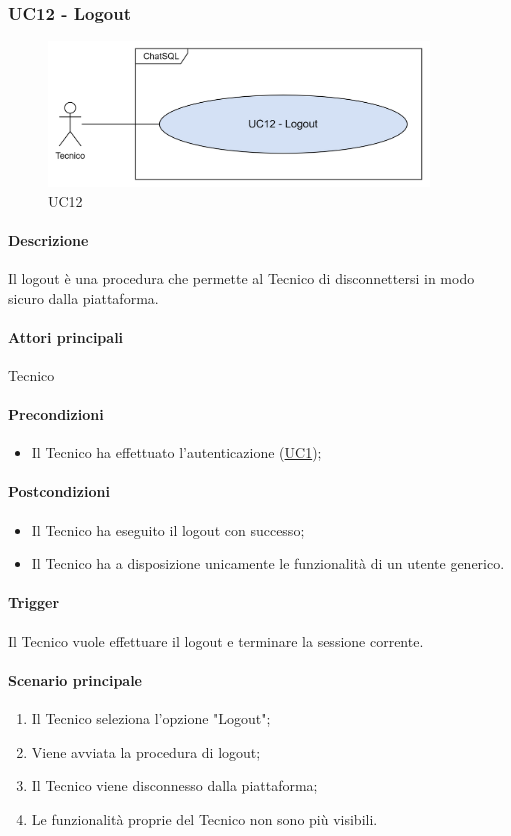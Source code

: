 \subsubsection{UC12 - Logout}\label{UC12}

\begin{figure}[H]
  \centering
  \includegraphics[width=0.90\textwidth]{assets/uc12.png}
  \caption{UC12}
\end{figure}

\paragraph*{Descrizione}
Il logout è una procedura che permette al Tecnico di disconnettersi in modo sicuro dalla piattaforma.

\paragraph*{Attori principali}
Tecnico

\paragraph*{Precondizioni}
\begin{itemize}
  \item Il Tecnico ha effettuato l'autenticazione (\hyperref[UC1]{UC1});
\end{itemize}

\paragraph*{Postcondizioni}
\begin{itemize}
  \item Il Tecnico ha eseguito il logout con successo;
  \item Il Tecnico ha a disposizione unicamente le funzionalità di un utente generico.
\end{itemize}

\paragraph*{Trigger}
Il Tecnico vuole effettuare il logout e terminare la sessione corrente.

\paragraph*{Scenario principale}
\begin{enumerate}
  \item Il Tecnico seleziona l'opzione "Logout";
  \item Viene avviata la procedura di logout;
  \item Il Tecnico viene disconnesso dalla piattaforma;
  \item Le funzionalità proprie del Tecnico non sono più visibili.
\end{enumerate}
